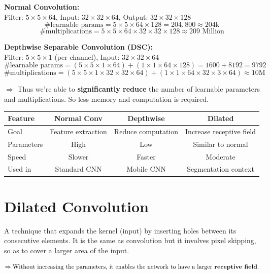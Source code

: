 \documentclass[12pt,a4paper]{article}
\begin{document}
\textbf{Normal Convolution:}\\
Filter: $5\times5\times64$, Input: $32\times32\times64$, Output: $32\times32\times128$
\[
\text{\# learnable params} = 5\times5\times64\times128 = 204{,}800 \approx 204\text{k}
\]
\[
\text{\# multiplications} = 5\times5\times64\times32\times32\times128 \approx 209\text{ Million}
\]

\textbf{Depthwise Separable Convolution (DSC):}\\
Filter: $5\times5\times1$ (per channel), Input: $32\times32\times64$
\[
\text{\# learnable params} = (5\times5\times1\times64) + (1\times1\times64\times128) = 1600 + 8192 = 9792
\]
\[
\text{\# multiplications} = (5\times5\times1\times32\times32\times64) + (1\times1\times64\times32\times3\times64)
\approx 10\text{M}
\]

$\Rightarrow$ Thus we're able to \textbf{significantly reduce} the number of learnable parameters and multiplications. So less memory and computation is required.

\begin{center}
\begin{tabular}{lccc}
\toprule
Feature & Normal Conv & Depthwise & Dilated \\
\midrule
Goal & Feature extraction & Reduce computation & Increase receptive field \\
Parameters & High & Low & Similar to normal \\
Speed & Slower & Faster & Moderate \\
Used in & Standard CNN & Mobile CNN & Segmentation context \\
\bottomrule
\end{tabular}
\end{center}

\section{Dilated Convolution}

\begin{definitionbox}
A technique that expands the kernel (input) by inserting holes between its consecutive elements. It is the same as convolution but it involves pixel skipping, so as to cover a larger area of the input.

\[
\Rightarrow \text{Without increasing the parameters, it enables the network to have a larger \textbf{receptive field}.}
\]
\end{definitionbox}
\end{document}
